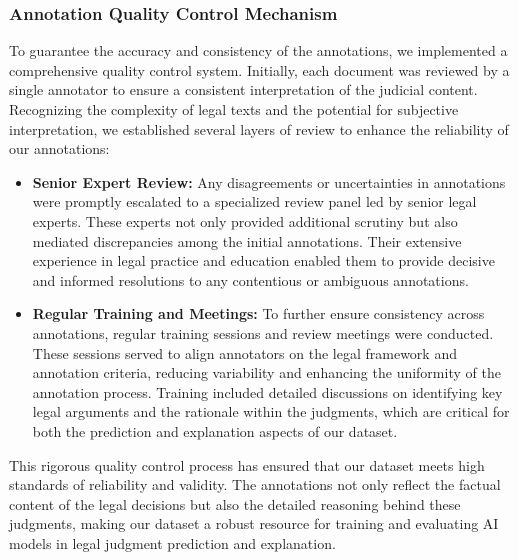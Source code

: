 \subsubsection{Annotation Quality Control Mechanism}
To guarantee the accuracy and consistency of the annotations, we implemented a comprehensive quality control system. Initially, each document was reviewed by a single annotator to ensure a consistent interpretation of the judicial content. Recognizing the complexity of legal texts and the potential for subjective interpretation, we established several layers of review to enhance the reliability of our annotations:
\begin{itemize}
    \item \textbf{Senior Expert Review:} Any disagreements or uncertainties in annotations were promptly escalated to a specialized review panel led by senior legal experts. These experts not only provided additional scrutiny but also mediated discrepancies among the initial annotations. Their extensive experience in legal practice and education enabled them to provide decisive and informed resolutions to any contentious or ambiguous annotations.
    \item \textbf{Regular Training and Meetings:} To further ensure consistency across annotations, regular training sessions and review meetings were conducted. These sessions served to align annotators on the legal framework and annotation criteria, reducing variability and enhancing the uniformity of the annotation process. Training included detailed discussions on identifying key legal arguments and the rationale within the judgments, which are critical for both the prediction and explanation aspects of our dataset.
\end{itemize}

This rigorous quality control process has ensured that our dataset meets high standards of reliability and validity. The annotations not only reflect the factual content of the legal decisions but also the detailed reasoning behind these judgments, making our dataset a robust resource for training and evaluating AI models in legal judgment prediction and explanation.

